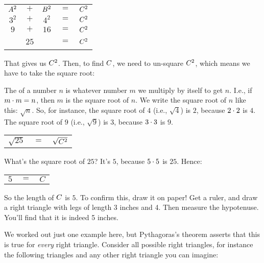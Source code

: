 \documentclass[../../../main.tex]{subfiles}
\begin{document}
\begin{center}
  \begin{tabular}{c c c c c}
    $A^{2}$ & $+$ & $B^{2}$ & $=$ & $C^{2}$ \\
    $3^{2}$ & $+$ & $4^{2}$ & $=$ & $C^{2}$ \\
    $9$ & $+$ & $16$ & $=$ & $C^{2}$ \\
    ~ & $25$ & ~ & $=$ & $C^{2}$
  \end{tabular}
\end{center}

That gives us $C^{2}$. Then, to find $C$, we need to un-square $C^{2}$, which means we have to take the square root:

\begin{terminology}
  The  of a number $n$ is whatever number $m$ we multiply by itself to get $n$. I.e., if $m \mult/ m = n$, then $m$ is the square root of $n$. We write the square root of $n$ like this: $\sqrt{n}$. So, for instance, the square root of $4$ (i.e., $\sqrt{4}$) is $2$, because $2 \mult/ 2$ is $4$. The square root of $9$ (i.e., $\sqrt{9}$) is $3$, because $3 \mult/ 3$ is $9$.
\end{terminology}

\begin{center}
  \begin{tabular}{c c c}
    $\sqrt{25}$ & $=$ & $\sqrt{C^{2}}$
  \end{tabular}
\end{center}

What's the square root of $25$? It's $5$, because $5 \mult/ 5$ is $25$. Hence:

\begin{center}
  \begin{tabular}{c c c}
    $5$ & $=$ & $C$
  \end{tabular}
\end{center}

So the length of $C$ is $5$. To confirm this, draw it on paper! Get a ruler, and draw a right triangle with legs of length 3 inches and 4. Then measure the hypotenuse. You'll find that it is indeed 5 inches.

We worked out just one example here, but Pythagoras's theorem asserts that this is true for \emph{every} right triangle. Consider all possible right triangles, for instance the following triangles and any other right triangle you can imagine:
\end{document}

